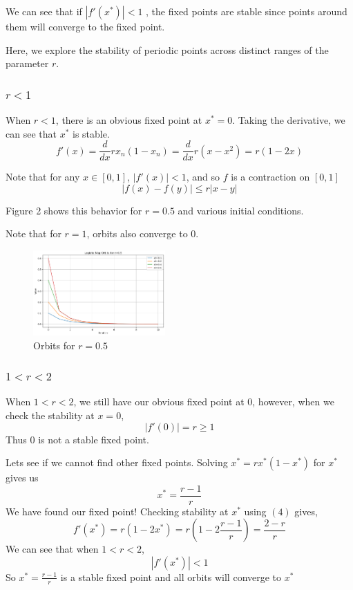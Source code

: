 \documentclass[11pt,twocolumn]{article}
\begin{document}
We can see that if $|f'(x^\ast)|<1$ , the fixed points are stable since points around them will converge to the fixed point.


Here, we explore the stability of periodic points across distinct ranges of the parameter $r$.


\subsubsection{$r < 1$}
When $r<1$, there is an obvious fixed point at $x^\ast=0$.
Taking the derivative, we can see that $x^\ast$ is stable.
\begin{equation}
f'(x)=\frac{d}{dx}rx_n(1-x_n)=\frac{d}{dx}r(x-x^2)=r(1-2x)
\end{equation}

Note that for any $x\in[0,1]$, $|f'(x)|<1$, and so $f$ is a contraction on $[0,1]$
\[|f(x)-f(y)|\leq r|x-y|\]

Figure 2 shows this behavior for $r=0.5$ and various initial conditions.

Note that for $r=1$, orbits also converge to 0.

\begin{figure}
    \centering
\includegraphics[width=0.45\textwidth]{figures/rles1.png}
    \caption{Orbits for $r=0.5$}
    \label{fig:enter-label}
\end{figure}

\subsubsection{$1 < r < 2$}
When $1 < r < 2$, we still have our obvious fixed point at 0, however, when we check the stability at $x=0$,
\[|f'(0)|=r\geq 1\]
Thus $0$ is not a stable fixed point.

Lets see if we cannot find other fixed points.
Solving $x^\ast=rx^\ast(1-x^\ast)$ for $x^\ast$ gives us
\begin{equation}
x^\ast=\frac{r-1}{r}
\end{equation}
We have found our fixed point!
Checking stability at $x^\ast$ using $(4)$ gives,
\[f'(x^\ast)=r(1-2x^\ast)=r(1-2\frac{r-1}{r})=\frac{2-r}{r}\]
We can see that when $1 < r< 2$,
\[|f'(x^\ast)|< 1\]
So $x^\ast=\frac{r-1}{r}$ is a stable fixed point and all orbits will converge to $x^\ast$
\end{document}
